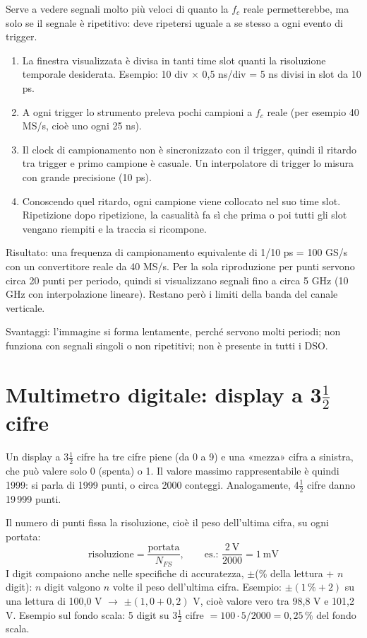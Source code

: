\documentclass[11pt,a4paper]{article}
\begin{document}
Serve a vedere segnali molto più veloci di quanto la $f_c$ reale permetterebbe, ma solo se il segnale è ripetitivo: deve ripetersi uguale a se stesso a ogni evento di trigger.
\begin{enumerate}
\item La finestra visualizzata è divisa in tanti time slot quanti la risoluzione temporale desiderata. Esempio: 10 div $\times$ 0,5 ns/div = 5 ns divisi in slot da 10 ps.
\item A ogni trigger lo strumento preleva pochi campioni a $f_c$ reale (per esempio 40 MS/s, cioè uno ogni 25 ns).
\item Il clock di campionamento non è sincronizzato con il trigger, quindi il ritardo tra trigger e primo campione è casuale. Un interpolatore di trigger lo misura con grande precisione (10 ps).
\item Conoscendo quel ritardo, ogni campione viene collocato nel suo time slot. Ripetizione dopo ripetizione, la casualità fa sì che prima o poi tutti gli slot vengano riempiti e la traccia si ricompone.
\end{enumerate}
Risultato: una frequenza di campionamento equivalente di 1/10 ps = 100 GS/s con un convertitore reale da 40 MS/s. Per la sola riproduzione per punti servono circa 20 punti per periodo, quindi si visualizzano segnali fino a circa 5 GHz (10 GHz con interpolazione lineare). Restano però i limiti della banda del canale verticale.

Svantaggi: l'immagine si forma lentamente, perché servono molti periodi; non funziona con segnali singoli o non ripetitivi; non è presente in tutti i DSO.

\section*{Multimetro digitale: display a 3\texorpdfstring{$\frac{1}{2}$}{½} cifre}

Un display a 3$\frac{1}{2}$ cifre ha tre cifre piene (da 0 a 9) e una «mezza» cifra a sinistra, che può valere solo 0 (spenta) o 1. Il valore massimo rappresentabile è quindi 1999: si parla di 1999 punti, o circa 2000 conteggi. Analogamente, 4$\frac{1}{2}$ cifre danno 19\,999 punti.

Il numero di punti fissa la risoluzione, cioè il peso dell'ultima cifra, su ogni portata:
\[
\text{risoluzione} = \frac{\text{portata}}{N_{FS}}, \qquad \text{es.: } \frac{2\ \mathrm{V}}{2000} = 1\ \mathrm{mV}
\]
I digit compaiono anche nelle specifiche di accuratezza, $\pm$(\% della lettura + $n$ digit): $n$ digit valgono $n$ volte il peso dell'ultima cifra. Esempio: $\pm(1\,\% + 2)$ su una lettura di 100,0 V $\rightarrow$ $\pm(1{,}0 + 0{,}2)$ V, cioè valore vero tra 98,8 V e 101,2 V. Esempio sul fondo scala: 5 digit su 3$\frac{1}{2}$ cifre $= 100\cdot5/2000 = 0{,}25\,\%$ del fondo scala.
\end{document}
